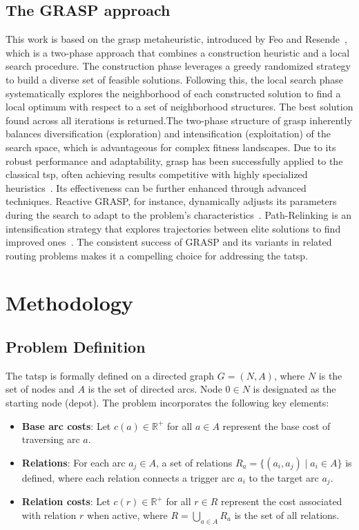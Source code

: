 \documentclass[twocolumn, switch]{article} %
\begin{document}
\subsection{The GRASP approach}

This work is based on the \gls{grasp} metaheuristic, introduced by Feo and Resende~\cite{Feo1995}, which is a two-phase approach that combines a construction heuristic and a local search procedure.
The construction phase leverages a greedy randomized strategy to build a diverse set of feasible solutions. Following this, the local search phase systematically explores the neighborhood of each constructed solution to find a local optimum with respect to a set of neighborhood structures.
The best solution found across all iterations is returned.The two-phase structure of \gls{grasp} inherently balances diversification (exploration) and intensification (exploitation) of the search space, which is advantageous for complex fitness landscapes.
Due to its robust performance and adaptability, \gls{grasp} has been successfully applied to the classical \gls{tsp}, often achieving results competitive with highly specialized heuristics~\cite{Oliveira2004}. 
Its effectiveness can be further enhanced through advanced techniques. Reactive GRASP, for instance, dynamically adjusts its parameters during the search to adapt to the problem's characteristics~\cite{Prais2000}. 
Path-Relinking is an intensification strategy that explores trajectories between elite solutions to find improved ones~\cite{Resende2019}. The consistent success of GRASP and its variants in related routing problems makes it a compelling choice for addressing the \gls{tatsp}.

\section{Methodology}

\subsection{Problem Definition}

The \gls{tatsp} is formally defined on a directed graph $G = (N, A)$, where $N$ is the set of nodes and $A$ is the set of directed arcs. Node $0 \in N$ is designated as the starting node (depot). The problem incorporates the following key elements:

\begin{itemize}
\item \textbf{Base arc costs}: Let $c(a) \in \mathbb{R}^+$ for all $a \in A$ represent the base cost of traversing arc $a$.
\item \textbf{Relations}: For each arc $a_j \in A$, a set of relations $R_a = \{(a_i, a_j) \mid a_i \in A\}$ is defined, where each relation connects a trigger arc $a_i$ to the target arc $a_j$.
\item \textbf{Relation costs}: Let $c(r) \in \mathbb{R}^+$ for all $r \in R$ represent the cost associated with relation $r$ when active, where $R = \bigcup_{a \in A} R_a$ is the set of all relations.
\end{itemize}
\end{document}
